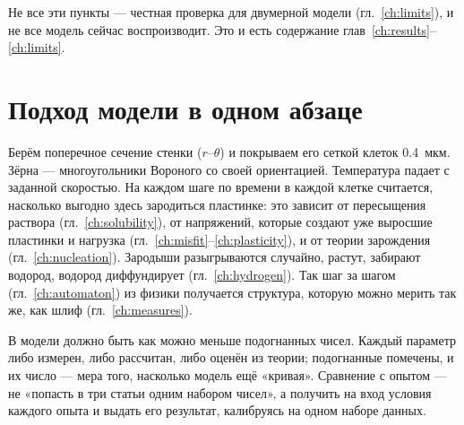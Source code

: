 Не все эти пункты --- честная проверка для двумерной модели (гл.~\ref{ch:limits}), и не все
модель сейчас воспроизводит. Это и есть содержание глав~\ref{ch:results}--\ref{ch:limits}.

\section{Подход модели в одном абзаце}

Берём поперечное сечение стенки ($r$--$\theta$) и покрываем его сеткой клеток 0.4~мкм. Зёрна ---
многоугольники Вороного со своей ориентацией. Температура падает с заданной скоростью. На каждом
шаге по времени в каждой клетке считается, насколько выгодно здесь зародиться пластинке:
это зависит от пересыщения раствора (гл.~\ref{ch:solubility}), от напряжений, которые создают
уже выросшие пластинки и нагрузка (гл.~\ref{ch:misfit}--\ref{ch:plasticity}), и от теории
зарождения (гл.~\ref{ch:nucleation}). Зародыши разыгрываются случайно, растут, забирают водород,
водород диффундирует (гл.~\ref{ch:hydrogen}). Так шаг за шагом (гл.~\ref{ch:automaton}) из
физики получается структура, которую можно мерить так же, как шлиф (гл.~\ref{ch:measures}).

\begin{idea}[Философия]
В модели должно быть как можно меньше подогнанных чисел. Каждый параметр либо измерен, либо
рассчитан, либо оценён из теории; подогнанные помечены, и их число --- мера того, насколько
модель ещё «кривая». Сравнение с опытом --- не «попасть в три статьи одним набором чисел», а
получить на вход условия каждого опыта и выдать его результат, калибруясь на одном наборе данных.
\end{idea}
